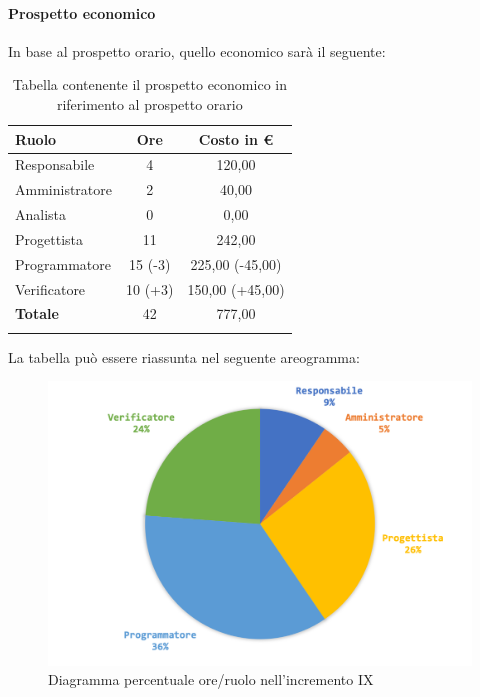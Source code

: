 		
		\paragraph{Prospetto economico}
			In base al prospetto orario, quello economico sarà il seguente: 
		
		\begin{longtable}{|l|c|c|}
			\hline
			\rowcolor{lighter-grayer}
			\textbf{Ruolo} & \textbf{Ore} & \textbf{Costo in € } \\
			\hline
			\endfirsthead
			
			\hline
			Responsabile 	    & 4 & 120,00\\
			\hline 
			\hline
			Amministratore	   & 2 & 40,00\\
			\hline
			\hline
			Analista 				& 0 & 0,00\\
			\hline
			\hline
			Progettista 		   & 11 & 242,00\\
			\hline
			\hline
			Programmatore 	  & 15 (-3) & 225,00 (-45,00)\\
			\hline
			\hline
			Verificatore 		   & 10 (+3) & 150,00 (+45,00)\\
			\hline
			\textbf{Totale} 	 & 42 & 777,00\\
			\hline
			\caption{Tabella contenente il prospetto economico in riferimento al prospetto orario}
		\end{longtable}
		\pagebreak
		
		La tabella può essere riassunta nel seguente areogramma:
		\begin{figure}[H]
			\centering
			\includegraphics[width=0.8\linewidth]{images/consuntivo/ConsIncr9-2.png}
			\caption{Diagramma percentuale ore/ruolo nell'incremento IX}
			\label{fig:consuntivo diagramma costi ruolo incremento IX}
		\end{figure}
	
